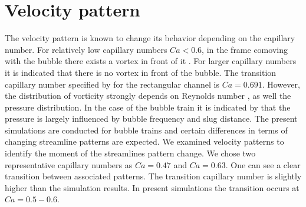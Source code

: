 \documentclass{article}
\begin{document}
\section{Velocity pattern}
\label{sec:velocity}
The velocity pattern is known to change its behavior depending on the capillary number. For
relatively low capillary numbers $Ca<0.6$, in the frame comoving with the bubble there exists a vortex 
in front of it \cite{heil-threedim}. For larger capillary numbers it is indicated that there is no
vortex in front of the bubble. The transition capillary number specified by
\citet{heil-threedim} for the rectangular channel is $Ca=0.691$. However, the
distribution of vorticity strongly depends on Reynolds number \cite{heil-bretherton}, as well the
pressure distribution. In the case of the bubble train it is indicated by \citet{kreutzer-taylor}
that the pressure is largely influenced by bubble frequency and slug distance. The present
simulations are conducted for bubble trains and certain differences in terms of changing streamline
patterns are expected. We examined velocity patterns to identify the moment of the streamlines
pattern change. We chose two
representative capillary numbers as $Ca=0.47$ and $Ca=0.63$. 
One can
see a clear transition between associated patterns. The transition capillary number
\cite{heil-threedim} is slightly higher than the simulation results. In present simulations the
transition occurs at $Ca=0.5-0.6$.
\end{document}
